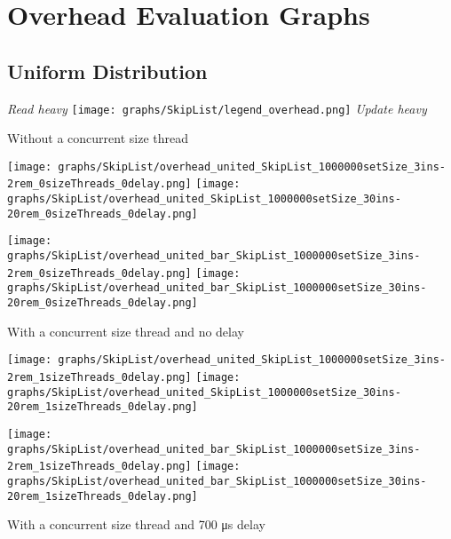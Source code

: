 \documentclass{article}
\begin{document}
\section*{Overhead Evaluation Graphs}
\subsection{Uniform Distribution}

\begin{figure*}[htbp]
    \centering
    \medskip
    \textit{Read heavy}\quad\quad
    \texttt{[image: graphs/SkipList/legend\_overhead.png]}\quad\quad
    \textit{Update heavy}\par
    \medskip
    Without a concurrent size thread\par
    \smallskip
    \texttt{[image: graphs/SkipList/overhead\_united\_SkipList\_1000000setSize\_3ins-2rem\_0sizeThreads\_0delay.png]}\hspace{2.5em}
    \texttt{[image: graphs/SkipList/overhead\_united\_SkipList\_1000000setSize\_30ins-20rem\_0sizeThreads\_0delay.png]}\par
    \texttt{[image: graphs/SkipList/overhead\_united\_bar\_SkipList\_1000000setSize\_3ins-2rem\_0sizeThreads\_0delay.png]}\hspace{2.5em}
    \texttt{[image: graphs/SkipList/overhead\_united\_bar\_SkipList\_1000000setSize\_30ins-20rem\_0sizeThreads\_0delay.png]}\par
    \medskip
    With a concurrent size thread and no delay\par
    \texttt{[image: graphs/SkipList/overhead\_united\_SkipList\_1000000setSize\_3ins-2rem\_1sizeThreads\_0delay.png]}\hspace{2.5em}
    \texttt{[image: graphs/SkipList/overhead\_united\_SkipList\_1000000setSize\_30ins-20rem\_1sizeThreads\_0delay.png]}\par
    \texttt{[image: graphs/SkipList/overhead\_united\_bar\_SkipList\_1000000setSize\_3ins-2rem\_1sizeThreads\_0delay.png]}\hspace{2.5em}
    \texttt{[image: graphs/SkipList/overhead\_united\_bar\_SkipList\_1000000setSize\_30ins-20rem\_1sizeThreads\_0delay.png]}\par
    \medskip
    With a concurrent size thread and 700 \si{\micro\second} delay\par

\end{figure*}
\end{document}
